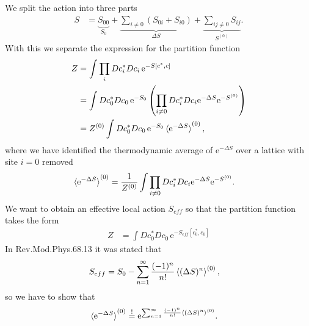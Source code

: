 \documentclass[12pt,a4paper]{scrartcl}
\numberwithin{equation}{section}
\begin{document}
We split the action into three parts
\begin{align}
 S &= \underbrace{S_{00}}_{S_0} + \underbrace{\sum_{i\neq 0} (S_{0i}+S_{i0}) }_{\Delta S} 
   + \underbrace{\sum_{ij\neq 0} S_{ij} }_{S^{(0)}}.
\end{align}
With this we separate the expression for the partition function
\begin{align}
 Z 
 &= \int \prod_i Dc^*_iDc_i \, \mathrm{e}^{-S[c^*,c]} \\
 &=\int  Dc^*_0Dc_0 \, \mathrm{e}^{-S_0}\left( \prod_{i\neq 0} Dc^*_iDc_i  \mathrm{e}^{-\Delta S} \mathrm{e}^{-S^{(0)}} \right) \\
 &=Z^{(0)}\int  Dc^*_0Dc_0 \, \mathrm{e}^{-S_0} \braket{ \mathrm{e}^{-\Delta S} }^{(0)} ,
\end{align}
where we have identified the thermodynamic average of $\mathrm{e}^{-\Delta S}$ over a lattice with site $i=0$ removed
\begin{align}
  \braket{ \mathrm{e}^{-\Delta S} }^{(0)}
  &= \frac{1}{Z^{(0)}} \int \prod_{i\neq 0} Dc^*_iDc_i  \mathrm{e}^{-\Delta S} \mathrm{e}^{-S^{(0)}}.
\end{align}
We want to obtain an effective local action $S_{eff} $ so that the partition function takes the form
\begin{align}
 Z 
 &=\int  Dc^*_0Dc_0 \, \mathrm{e}^{-S_{eff}[c^*_0,c_0]  }
\end{align}
In Rev.Mod.Phys.68.13 it was stated that 
\begin{align}
 S_{eff} &=S_0 - \sum_{n=1}^{\infty} \frac{(-1)^n}{n!} \braket{ (\Delta S)^n }^{(0)},
\end{align}
so we have to show that 
\begin{align}
 \braket{ \mathrm{e}^{-\Delta S} }^{(0)}
 & \stackrel{!}{=} \mathrm{e}^{  \sum_{n=1}^{\infty} \frac{(-1)^n}{n!} \braket{ (\Delta S)^n }^{(0)}} .
\end{align}


% 
\end{document}
